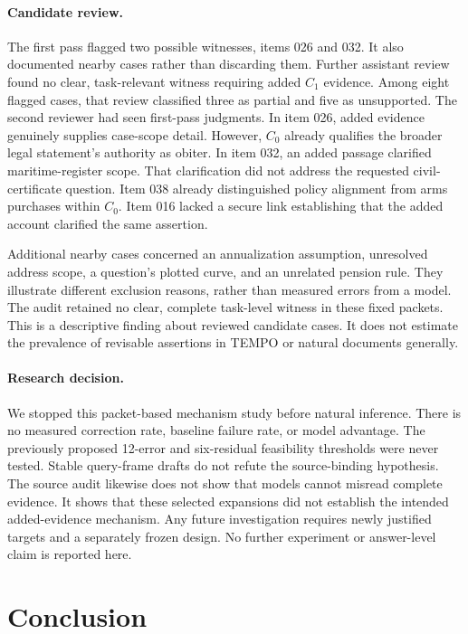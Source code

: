 \documentclass[11pt]{article}
\begin{document}
\paragraph{Candidate review.}
The first pass flagged two possible witnesses, items 026 and 032.
It also documented nearby cases rather than discarding them.
Further assistant review found no clear, task-relevant witness requiring added $C_1$ evidence.
Among eight flagged cases, that review classified three as partial and five as unsupported.
The second reviewer had seen first-pass judgments.
In item 026, added evidence genuinely supplies case-scope detail.
However, $C_0$ already qualifies the broader legal statement's authority as obiter.
In item 032, an added passage clarified maritime-register scope.
That clarification did not address the requested civil-certificate question.
Item 038 already distinguished policy alignment from arms purchases within $C_0$.
Item 016 lacked a secure link establishing that the added account clarified the same assertion.

Additional nearby cases concerned an annualization assumption, unresolved address scope, a question's plotted curve, and an unrelated pension rule.
They illustrate different exclusion reasons, rather than measured errors from a model.
The audit retained no clear, complete task-level witness in these fixed packets.
This is a descriptive finding about reviewed candidate cases.
It does not estimate the prevalence of revisable assertions in TEMPO or natural documents generally.

\paragraph{Research decision.}
We stopped this packet-based mechanism study before natural inference.
There is no measured correction rate, baseline failure rate, or model advantage.
The previously proposed 12-error and six-residual feasibility thresholds were never tested.
Stable query-frame drafts do not refute the source-binding hypothesis.
The source audit likewise does not show that models cannot misread complete evidence.
It shows that these selected expansions did not establish the intended added-evidence mechanism.
Any future investigation requires newly justified targets and a separately frozen design.
No further experiment or answer-level claim is reported here.

\section{Conclusion}
\end{document}
